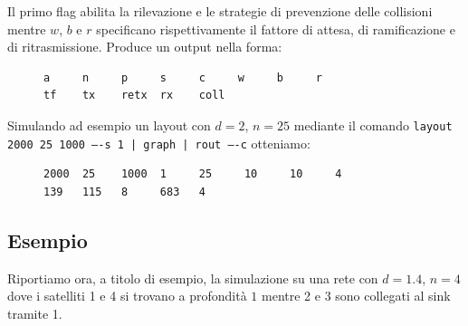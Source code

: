 \documentclass[a4paper,12pt]{article}
\theoremstyle{definition}
\begin{document}
Il primo flag abilita la rilevazione e le strategie di prevenzione delle collisioni mentre $w$, $b$ e $r$ specificano rispettivamente il fattore di attesa, di ramificazione e di ritrasmissione. Produce un output nella forma:

\begin{figure}[H]
\centering
\begin{BVerbatim}
a     n     p     s     c     w     b     r
tf    tx    retx  rx    coll
\end{BVerbatim}
\end{figure}

Simulando ad esempio un layout con $d=2$, $n=25$ mediante il comando \texttt{layout 2000 25 1000 ----s 1 | graph | rout ----c} otteniamo:

\begin{figure}[H]
\centering
\begin{BVerbatim}
2000  25    1000  1     25     10     10     4
139   115   8     683   4
\end{BVerbatim}
\end{figure}

\subsection{Esempio}

Riportiamo ora, a titolo di esempio, la simulazione su una rete con $d=1.4$, $n=4$ dove i satelliti 1 e 4 si trovano a profondità $1$ mentre 2 e 3 sono collegati al sink tramite 1.

\end{document}
